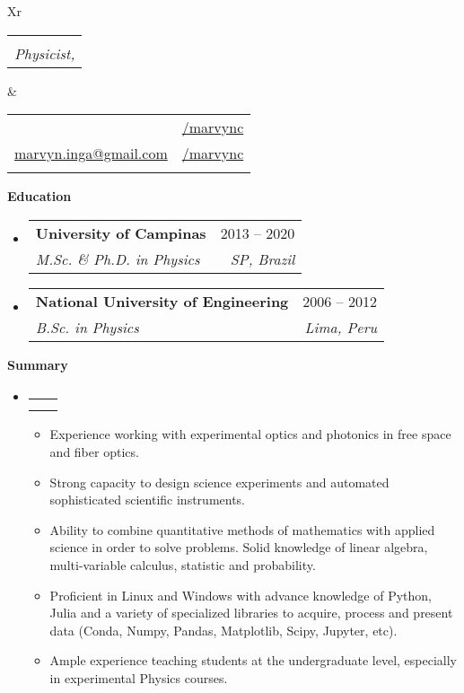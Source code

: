 \documentclass[letterpaper,12pt]{article}[leftmargin=*]
\makeatletter
\def \fullname {Marvyn Inga}
\def \subtitle {Physicist, \faMale}
\def \linkedinicon {\faLinkedin}
\def \linkedinlink {https://www.linkedin.com/in/marvync/}
\def \linkedintext {/marvync}
\def \phoneicon {\faPhone}
\def \phonetext {+55-19-983638657}
\def \emailicon {\faEnvelope}
\def \emaillink {mailto:marvyn.inga@gmail.com}
\def \emailtext {marvyn.inga@gmail.com}
\def \githubicon {\faGithub}
\def \githublink {https://github.com/marvync}
\def \githubtext {/marvync}
\def \headertype {\doublecol} %
\def \entryspacing {-0pt}
\def \linkedin {\linkedinicon \hspace{3pt}\href{\linkedinlink}{\linkedintext}}
\def \phone {\phoneicon \hspace{3pt}{ \phonetext}}
\def \email {\emailicon \hspace{3pt}\href{\emaillink}{\emailtext}}
\def \github {\githubicon \hspace{3pt}\href{\githublink}{\githubtext}}
\renewcommand{\section}[2]{\vspace{5pt}
  \colorbox{secondary}{\color{white}\raggedbottom\normalsize\textbf{{#1}{\hspace{7pt}#2}}}
}
\newcommand{\resumeEntryStart}{\begin{itemize}[leftmargin=2.5mm]}
\newcommand{\resumeEntryEnd}{\end{itemize}\vspace{\entryspacing}}
\newcommand{\resumeItemListStart}{\begin{itemize}[leftmargin=4.5mm]}
\newcommand{\resumeItemListEnd}{\end{itemize}}
\newcommand{\resumeItem}[1]{
  \item\small{
    {#1 \vspace{-2pt}}
  }
}
\newcommand{\resumeEntryTSDL}[4]{
  \vspace{-1pt}\item[]
    \begin{tabularx}{0.97\textwidth}{X@{\hspace{60pt}}r}
      \textbf{\color{primary}#1} & {\firabook\color{accent}\small#2} \\
      \textit{\color{accent}\small#3} & \textit{\color{accent}\small#4} \\
    \end{tabularx}\vspace{-6pt}
}
\newcommand{\doublecol}[6]{
  \begin{tabularx}{\textwidth}{Xr}
    {
      \begin{tabular}[c]{l}
        \fontsize{35}{45}\selectfont{\color{primary}{{\textbf{\fullname}}}} \\
        {\textit{\subtitle}} %
      \end{tabular}
    } & {
      \begin{tabular}[c]{l@{\hspace{1.5em}}l}
        {\small#4} & {\small#1} \\
        {\small#5} & {\small#2} \\
        {\small#6} & {\small#3}
      \end{tabular}
    }
  \end{tabularx}
}
\newcommand{\singlecol}[6]{
  \begin{tabularx}{\textwidth}{Xr}
    {
      \begin{tabular}[b]{l}
        \fontsize{35}{45}\selectfont{\color{primary}{{\textbf{\fullname}}}} \\
        {\textit{\subtitle}} %
      \end{tabular}
    } & {
      \begin{tabular}[c]{l}
        {\small#1} \\
        {\small#2} \\
        {\small#3} \\
        {\small#4} \\
        {\small#5} \\
        {\small#6}
      \end{tabular}
    }
  \end{tabularx}
}
\makeatother
\begin{document}


\headertype{\linkedin}{\github}{}{\phone}{\email}{} %

\section{\faGraduationCap}{Education}
\vspace{-0.05cm}
\resumeEntryStart
	\resumeEntryTSDL
    {University of Campinas}{2013 -- 2020}
	{M.Sc. \& Ph.D. in Physics}{SP, Brazil}
\resumeEntryEnd

\vspace{-0.4cm}

\resumeEntryStart
	\resumeEntryTSDL
	{National University of Engineering}{2006 -- 2012}
	{B.Sc. in Physics}{Lima, Peru}
\resumeEntryEnd
\vspace{-0.2cm}

\section{\faFolderOpen}{Summary}
\vspace{-1.3cm}

\resumeEntryStart
\resumeEntryTSDL
{}{}
{}{}
\resumeItemListStart
\resumeItem {Experience working with experimental optics and photonics in free space and fiber optics.}
\resumeItem {Strong capacity to design science experiments and automated sophisticated scientific instruments.}
\resumeItem {Ability to combine quantitative methods of mathematics with applied science in order to solve problems. Solid knowledge of linear algebra, multi-variable calculus, statistic and probability.}
\resumeItem {Proficient in Linux and Windows with advance knowledge of Python, Julia and a variety of specialized libraries to acquire, process and present data (Conda, Numpy, Pandas, Matplotlib, Scipy, Jupyter, etc).}
\resumeItem {Ample experience teaching students at the undergraduate level, especially in experimental Physics courses.}
\resumeItemListEnd
\resumeEntryEnd
\vspace{-0.2cm}
\end{document}
